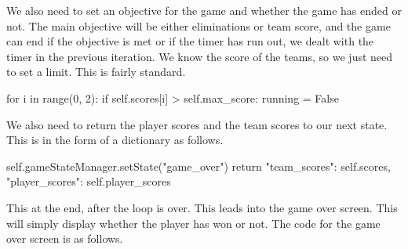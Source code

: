 \vs
We also need to set an objective for the game and whether the game has ended or not. The main objective will be either eliminations or team score, and the game can end if the objective is met or if the timer has run out, we dealt with the timer in the previous iteration. We know the score of the teams, so we just need to set a limit. This is fairly standard.

\begin{mpy}
            for i in range(0, 2):
                if self.scores[i] > self.max_score:
                    running = False
\end{mpy}

We also need to return the player scores and the team scores to our next state. This is in the form of a dictionary as follows.

\begin{mpy}
        self.gameStateManager.setState("game_over")
        return {"team_scores": self.scores, "player_scores": self.player_scores}
\end{mpy}

This at the end, after the  loop is over. This leads into the game over screen. This will simply display whether the player has won or not. The code for the game over screen is as follows.

